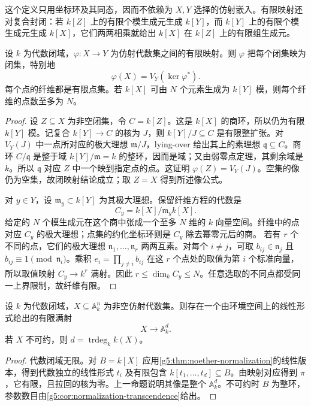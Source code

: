这个定义只用坐标环及其同态，因而不依赖为 \(X,Y\) 选择的仿射嵌入。有限映射还对复合封闭：若 \(k[Z]\) 上的有限个模生成元生成 \(k[Y]\)，而 \(k[Y]\) 上的有限个模生成元生成 \(k[X]\)，它们两两相乘就给出 \(k[X]\) 在 \(k[Z]\) 上的有限组生成元。

\begin{proposition}\label{g5:prop:finite-affine-closed-fibres}
	设 \(k\) 为代数闭域，\(\varphi:X\to Y\) 为仿射代数集之间的有限映射。则 \(\varphi\) 把每个闭集映为闭集，特别地
	\[
	\varphi(X)=V_Y(\ker\varphi^*).
	\]
	每个点的纤维都是有限点集。若 \(k[X]\) 可由 \(N\) 个元素生成为 \(k[Y]\) 模，则每个纤维的点数至多为 \(N\)。
\end{proposition}
\begin{proof}
	设 \(Z\subseteq X\) 为非空闭集，令 \(C=k[Z]\)。这是 \(k[X]\) 的商环，所以仍为有限 \(k[Y]\) 模。记复合 \(k[Y]\to C\) 的核为 \(J\)，则
	\(k[Y]/J\subseteq C\) 是有限整扩张。对 \(V_Y(J)\) 中一点所对应的极大理想 \(\mathfrak m/J\)，lying-over 给出其上的素理想 \(\mathfrak q\subseteq C\)。商环 \(C/\mathfrak q\) 是整于域 \(k[Y]/\mathfrak m=k\) 的整环，因而是域；又由弱零点定理，其剩余域是 \(k\)。所以 \(\mathfrak q\) 对应 \(Z\) 中一个映到指定点的点。这证明 \(\varphi(Z)=V_Y(J)\)。空集的像仍为空集，故闭映射结论成立；取 \(Z=X\) 得到所述像公式。

	对 \(y\in Y\)，设 \(\mathfrak m_y\subset k[Y]\) 为其极大理想。保留纤维方程的代数是
	\[
	C_y=k[X]/\mathfrak m_yk[X].
	\]
	给定的 \(N\) 个模生成元在这个商中张成一个至多 \(N\) 维的 \(k\) 向量空间。纤维中的点对应 \(C_y\) 的极大理想；点集的约化坐标环则是 \(C_y\) 除去幂零元后的商。
	若有 \(r\) 个不同的点，它们的极大理想 \(\mathfrak n_1,\ldots,\mathfrak n_r\) 两两互素。对每个 \(i\ne j\)，可取 \(b_{ij}\in\mathfrak n_j\) 且 \(b_{ij}\equiv1\pmod{\mathfrak n_i}\)。乘积 \(e_i=\prod_{j\ne i}b_{ij}\) 在这 \(r\) 个点处的取值为第 \(i\) 个标准向量，所以取值映射 \(C_y\to k^r\) 满射。因此
	\(r\leq\dim_k C_y\leq N\)。任意选取的不同点都受同一上界限制，故纤维有限。
\end{proof}

\begin{corollary}\label{g5:cor:finite-geometric-projection}
	设 \(k\) 为代数闭域，\(X\subseteq\mathbb A_k^n\) 为非空仿射代数集。则存在一个由环境空间上的线性形式给出的有限满射
	\[
	X\longrightarrow\mathbb A_k^d.
	\]
	若 \(X\) 不可约，则 \(d=\operatorname{trdeg}_k k(X)\)。
\end{corollary}
\begin{proof}
	代数闭域无限。对 \(B=k[X]\) 应用\cref{g5:thm:noether-normalization}的线性版本，得到代数独立的线性形式 \(t_i\) 及有限包含
	\(k[t_1,\ldots,t_d]\subseteq B\)。由映射对应得到 \(\pi\)，它有限，且拉回的核为零。上一命题说明其像是整个 \(\mathbb A_k^d\)。不可约时 \(B\) 为整环，参数数目由\cref{g5:cor:normalization-transcendence}给出。
\end{proof}

